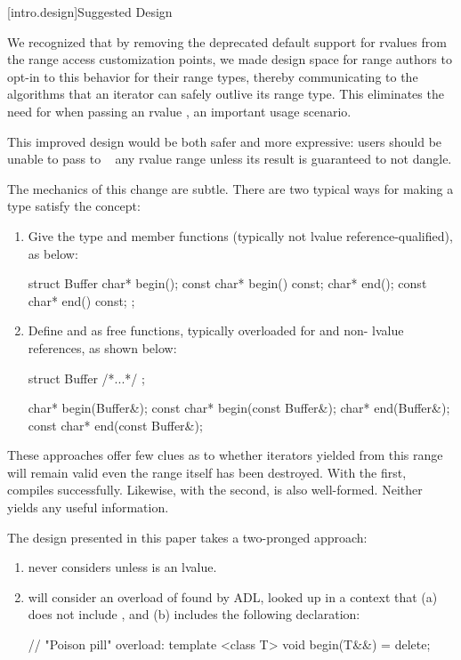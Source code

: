 [intro.design]{Suggested Design}

\pnum
We recognized that by removing the deprecated default support for rvalues from
the range access customization points, we made design space for range authors to
opt-in to this behavior for their range types, thereby communicating to the
algorithms that an iterator can safely outlive its range type. This eliminates
the need for  when passing an rvalue  , an important usage scenario.

\pnum
This improved design would be both safer and more expressive: users should be
unable to pass to \ 
any rvalue range unless its result is guaranteed to not dangle.

\pnum
The mechanics of this change are subtle. There are two typical ways for making
a type satisfy the  concept:

\begin{enumerate}
\item Give the type  and  member functions
(typically not lvalue reference-qualified), as below:
\begin{codeblock}
struct Buffer {
  char* begin();
  const char* begin() const;
  char* end();
  const char* end() const;
};
\end{codeblock}
\item Define  and  as free functions, typically
overloaded for  and non- lvalue references, as shown
below:
\begin{codeblock}
struct Buffer { /*...*/ };

char* begin(Buffer&);
const char* begin(const Buffer&);
char* end(Buffer&);
const char* end(const Buffer&);
\end{codeblock}
\end{enumerate}

\pnum
These approaches offer few clues as to whether iterators yielded from this range
will remain valid even the range itself has been destroyed. With the first,
 compiles successfully. Likewise, with the second,
 is also well-formed. Neither yields any useful
information.

\pnum
The design presented in this paper takes a two-pronged approach:

\begin{enumerate}
\item {} never considers
 unless  is an lvalue.
\item {} will consider an overload of
 found by ADL, looked up in a context that (a) does not include
, and (b) includes the following
declaration:
\begin{codeblock}
// "Poison pill" overload:
template <class T>
void begin(T&&) = delete;
\end{codeblock}
\end{enumerate}

